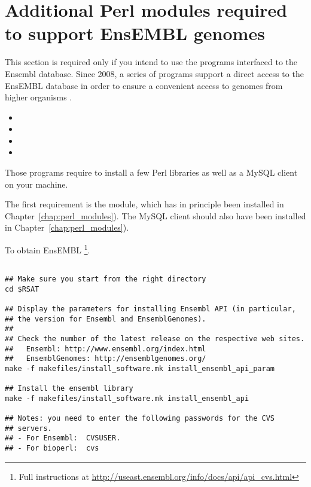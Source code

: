 \documentclass[12pt,a4paper, oneside]{scrreprt} %
\begin{document}
\section{Additional Perl modules required to support EnsEMBL genomes}
\label{sect:ensembl_libraries}

This section is required only if you intend to use the \RSAT programs
interfaced to the Ensembl database.  Since 2008, a series of \RSAT
programs support a direct access to the EnsEMBL database in order to
ensure a convenient access to genomes from higher organisms
\cite{Sand:2009}.

\begin{itemize}
\item {}
\item {}
\item {} 
\item {}
\end{itemize}

Those programs require to install a few Perl libraries as well as a
MySQL client on your machine.

The first requirement is the  module, which has in
principle been installed in Chapter~\ref{chap:perl_modules}). The
MySQL client should also have been installed in
Chapter~\ref{chap:perl_modules}).

To obtain EnsEMBL \footnote{Full instructions at
  \url{http://useast.ensembl.org/info/docs/api/api_cvs.html}}.

\begin{lstlisting}

## Make sure you start from the right directory
cd $RSAT

## Display the parameters for installing Ensembl API (in particular,
## the version for Ensembl and EnsemblGenomes).
##
## Check the number of the latest release on the respective web sites. 
##   Ensembl: http://www.ensembl.org/index.html
##   EnsemblGenomes: http://ensemblgenomes.org/
make -f makefiles/install_software.mk install_ensembl_api_param

## Install the ensembl library
make -f makefiles/install_software.mk install_ensembl_api 

## Notes: you need to enter the following passwords for the CVS
## servers.
## - For Ensembl:  CVSUSER.
## - For bioperl:  cvs

\end{lstlisting}
\end{document}
